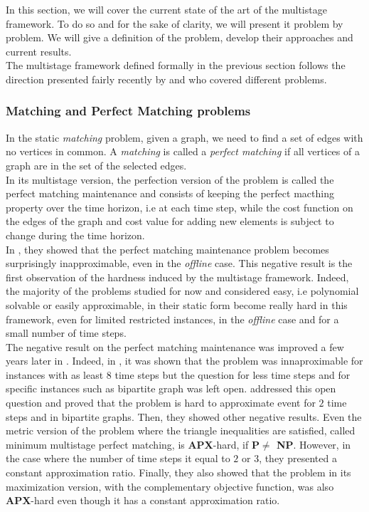 \documentclass[a4paper]{book}
\begin{document}
In this section, we will cover the current state of the art of the multistage framework. To do so and for the sake of clarity, we will present it problem by problem. We will give a definition of the problem, develop their approaches and current results.\\
The multistage framework defined formally in the previous section follows the direction presented fairly recently by \cite{Gupta} and \cite{Eisenstat} who covered different problems.

\subsubsection{Matching and Perfect Matching problems}
In the static {\emph {matching}} problem, given a graph, we need to find a set of edges with no vertices in common. A {\emph {matching}} is called a {\emph {perfect matching}} if all vertices of a graph are in the set of the selected edges.\\ 
In its multistage version, the perfection version of the problem is called the {\sc perfect matching maintenance} and consists of keeping the perfect macthing property over the time horizon, i.e at each time step, while the cost function on the edges of the graph and cost value for adding new elements is subject to change during the time horizon.\\

In \cite{Gupta}, they showed that the {\sc perfect matching maintenance} problem becomes surprisingly inapproximable, even in the \emph{offline} case. This negative result is the first observation of the hardness induced by the multistage framework. Indeed, the majority of the problems studied for now and considered easy, i.e polynomial solvable or easily approximable, in their static form become really hard in this framework, even for limited restricted instances, in the \emph{offline} case and for a small number of time steps.\\

The negative result on the {\sc perfect matching maintenance} was improved a few years later in \cite{bampis2018multistage}. Indeed, in \cite{Gupta}, it was shown that the problem was innaproximable for instances with as least $8$ time steps but the question for less time steps and for specific instances such as bipartite graph was left open. \cite{bampis2018multistage} addressed this open question and proved that the problem is hard to approximate event for $2$ time steps and in bipartite graphs. Then, they showed other negative results. Even the metric version of the problem where the triangle inequalities are satisfied, called {\sc minimum multistage perfect matching}, is \textbf{APX}-hard, if \textbf{P$\ne$ NP}. However, in the case where the number of time steps it equal to $2$ or $3$, they presented a constant approximation ratio. Finally, they also showed that the problem in its maximization version, with the complementary objective function, was also \textbf{APX}-hard even though it has a constant approximation ratio. \\
\end{document}
